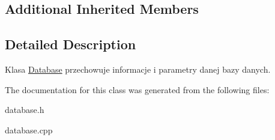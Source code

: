 \subsection*{Additional Inherited Members}


\subsection{Detailed Description}
Klasa \mbox{\hyperlink{class_database}{Database}} przechowuje informacje i parametry danej bazy danych. 

The documentation for this class was generated from the following files\+:\begin{DoxyCompactItemize}
\item 
database.\+h\item 
database.\+cpp\end{DoxyCompactItemize}
